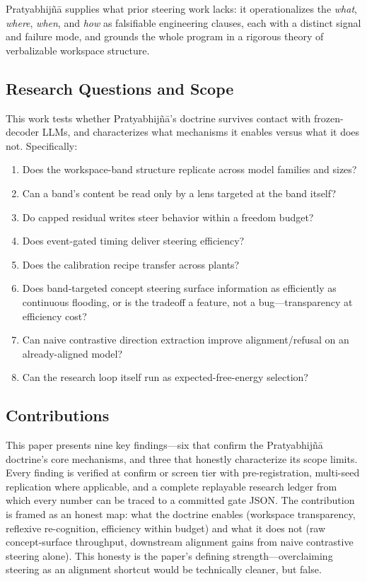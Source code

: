 Pratyabhij\~n\=a supplies what prior steering work lacks: it operationalizes the \emph{what}, \emph{where}, \emph{when}, and \emph{how}
as falsifiable engineering clauses, each with a distinct signal and failure mode, and grounds the whole program in a rigorous
theory of verbalizable workspace structure.

\subsection*{Research Questions and Scope}

This work tests whether Pratyabhij\~n\=a's doctrine survives contact with frozen-decoder LLMs,
and characterizes what mechanisms it enables versus what it does not. Specifically:
\begin{enumerate}
\item Does the workspace-band structure replicate across model families and sizes?
\item Can a band's content be read only by a lens targeted at the band itself?
\item Do capped residual writes steer behavior within a freedom budget?
\item Does event-gated timing deliver steering efficiency?
\item Does the calibration recipe transfer across plants?
\item Does band-targeted concept steering surface information as efficiently as continuous flooding,
      or is the tradeoff a feature, not a bug---transparency at efficiency cost?
\item Can naive contrastive direction extraction improve alignment/refusal on an already-aligned model?
\item Can the research loop itself run as expected-free-energy selection?
\end{enumerate}

\subsection*{Contributions}

This paper presents nine key findings---six that confirm the Pratyabhij\~n\=a doctrine's core mechanisms,
and three that honestly characterize its scope limits. Every finding is verified at confirm or screen tier with
pre-registration, multi-seed replication where applicable, and a complete replayable research ledger from which
every number can be traced to a committed gate JSON. The contribution is framed as an honest map: what the
doctrine enables (workspace transparency, reflexive re-cognition, efficiency within budget) and what it does
not (raw concept-surface throughput, downstream alignment gains from naive contrastive steering alone). This
honesty is the paper's defining strength---overclaiming steering as an alignment shortcut would be technically
cleaner, but false.

